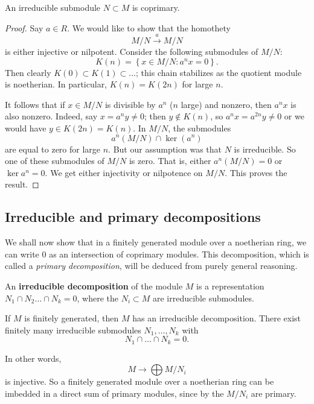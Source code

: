 \begin{proposition} \label{irrediscoprimary}
An irreducible submodule $N \subset M$ is coprimary.
\end{proposition} 
\begin{proof} 
Say $a \in R$. We would like to show that the homothety 
\[ M/N \stackrel{a}{\to} M/N  \]
is either injective or nilpotent.
Consider  the following submodules of $M/N$:
\[ K(n) =  \left\{x \in M/N: a^n x = 0\right\} . \]
Then clearly $K(0) \subset K(1) \subset \dots$; this chain stabilizes  as
the quotient module is noetherian.
In particular, $K(n) = K(2n)$ for large $n$. 

It follows that if $x \in M/N$ is divisible by $a^n$ ($n$ large) and nonzero, then $a^n x$
is also nonzero. Indeed, say $x = a^n y \neq 0$; then $y \notin K(n)$, so $a^{n}x =
a^{2n}y \neq 0$ or we would have $y \in K(2n) = K(n)$. In $M/N$, the submodules
\[ a^n(M/N) \cap \ker(a^n)  \]
are equal to zero for large $n$. But our assumption was that $N$ is
irreducible.  So one of these submodules of $M/N$ is zero. That is, either
$a^n(M/N) = 0$ or $\ker a^n = 0$. We get either injectivity or nilpotence on
$M/N$. This proves the result.
\end{proof} 
 
\subsection{Irreducible and primary decompositions}

We shall now show that in a finitely generated module over a noetherian ring,
we can write $0$ as an intersection of coprimary modules. This decomposition,
which is called a \emph{primary decomposition}, will be deduced from purely
general reasoning.

\begin{definition} 
An \textbf{irreducible decomposition} of the module $M$ is a representation
$N_1 \cap N_2 \dots \cap N_k  = 0$, where the $N_i \subset M$ are irreducible
submodules.
\end{definition} 

\begin{proposition} 
If $M$ is finitely generated, then $M$ has an irreducible decomposition. There exist finitely many irreducible
submodules $N_1, \dots, N_k$ with
\[  N_1 \cap \dots \cap N_k = 0. \]
\end{proposition} 
In other words,
\[  M \to \bigoplus M/N_i  \]
is injective.
So a finitely generated module over a noetherian ring can be imbedded in a direct sum of
primary modules, since by  the $M/N_i$ are
primary. 

